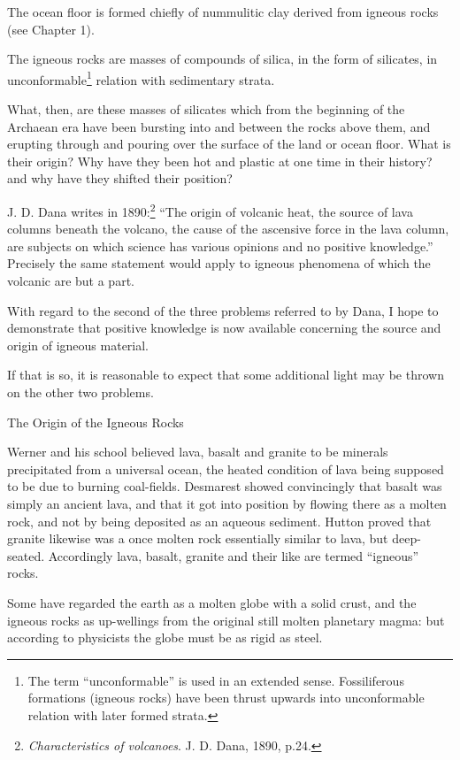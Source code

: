 \documentclass[a4paper, 12pt, oneside]{article}
\begin{document}
The ocean floor is formed chiefly of nummulitic clay derived from igneous rocks (see Chapter 1).

The igneous rocks are masses of compounds of silica, in the form of silicates, in unconformable\footnote{The term ``unconformable'' is used in an extended sense. Fossiliferous formations (igneous rocks) have been thrust upwards into unconformable relation with later formed strata.} relation with sedimentary strata.

What, then, are these masses of silicates which from the beginning of the Archaean era have been bursting into and between the rocks above them, and erupting through and pouring over the surface of the land or ocean floor. What is their origin? Why have they been hot and plastic at one time in their history? and why have they shifted their position?

J. D. Dana writes in 1890:\footnote{\emph{Characteristics of volcanoes}. J. D. Dana, 1890, p.24.} ``The origin of volcanic heat, the source of lava columns beneath the volcano, the cause of the ascensive force in the lava column, are subjects on which science has various opinions and no positive knowledge.'' Precisely the same statement would apply to igneous phenomena of which the volcanic are but a part.

With regard to the second of the three problems referred to by Dana, I hope to demonstrate that positive knowledge is now available concerning the source and origin of igneous material.

If that is so, it is reasonable to expect that some additional light may be thrown on the other two problems.

The Origin of the Igneous Rocks

Werner and his school believed lava, basalt and granite to be minerals precipitated from a universal ocean, the heated condition of lava being supposed to be due to burning coal-fields. Desmarest showed convincingly that basalt was simply an ancient lava, and that it got into position by flowing there as a molten rock, and not by being deposited as an aqueous sediment. Hutton proved that granite likewise was a once molten rock essentially similar to lava, but deep-seated. Accordingly lava, basalt, granite and their like are termed ``igneous'' rocks.

Some have regarded the earth as a molten globe with a solid crust, and the igneous rocks as up-wellings from the original still molten planetary magma: but according to physicists the globe must be as rigid as steel.
\end{document}
